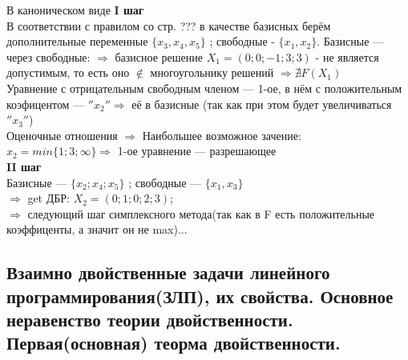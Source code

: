 В каноническом виде 
\textbf{I шаг}\\
В соответствии с правилом со стр. ??? в качестве базисных берём дополнительные переменные $\{x_3, x_4, x_5\}$ ; свободные - $\{x_1, x_2\}$. Базисные --- через свободные:
 $\Rightarrow$ базисное решение $X_1 = (0;0;-1;3;3)$ - не является допустимым, то есть оно $\notin$ многоугольнику решений $\Rightarrow \nexists F(X_1)$ \\
Уравнение с отрицательным свободным членом --- 1-ое, в нём с положительным коэфицентом --- $''x_2'' \Rightarrow $ её в базисные (так как при этом будет увеличиваться $''x_3''$) \\
Оценочные отношения $\Rightarrow$ Наибольшее возможное зачение: $x_2 = min \{1;3; \infty \} \Rightarrow$ 1-ое уравнение  --- разрешающее \\
\textbf{II шаг}\\
Базисные --- $\{x_2; x_4; x_5\}$ ; свободные --- $\{x_1, x_3\}$\\
$\Rightarrow$ get ДБР: $X_2=(0;1;0;2;3)$; \\
$\Rightarrow$ следующий шаг симплексного метода(так как в F есть положительные коэффиценты, а значит он не max)...
\subsection{Взаимно двойственные задачи линейного программирования(ЗЛП), их свойства. Основное неравенство теории двойственности. Первая(основная) теорма двойственности.}
